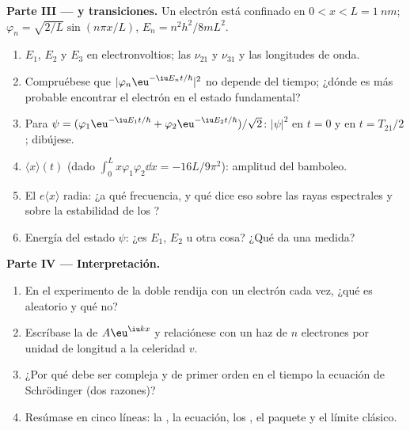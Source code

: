 \begin{problem}
\textbf{Parte III ---  y transiciones.}
Un electrón está confinado en $0 < x < L = \qty{1}{nm}$; $\varphi_n =
\sqrt{2/L}\sin(n\pi x/L)$, $E_n = n^2h^2/8mL^2$.
\begin{enumerate}[resume]
  \item $E_1$, $E_2$ y $E_3$ en electronvoltios; las 
        $\nu_{21}$ y $\nu_{31}$ y las longitudes de onda.
  \item Compruébese que $|\varphi_n\eu^{-\iu E_nt/\hbar}|^2$ no depende del tiempo;
        ¿dónde es más probable encontrar el electrón en el estado fundamental?
  \item Para $\psi = (\varphi_1\eu^{-\iu E_1t/\hbar} + \varphi_2\eu^{-\iu E_2t/\hbar})/
        \sqrt2$: $|\psi|^2$ en $t = 0$ y en $t = T_{21}/2$; dibújese.
  \item $\langle x\rangle(t)$ (dado $\int_0^Lx\varphi_1\varphi_2\dd x = -16L/9\pi^2$):
        amplitud del bamboleo.
  \item El  $e\langle x\rangle$ radia: ¿a qué
        frecuencia, y qué dice eso sobre las rayas espectrales y
        sobre la estabilidad de los ?
  \item Energía del estado $\psi$: ¿es $E_1$, $E_2$ u otra
        cosa? ¿Qué da una medida?
\end{enumerate}

\textbf{Parte IV --- Interpretación.}
\begin{enumerate}[resume]
  \item En el experimento de la doble rendija con un electrón cada vez, ¿qué es aleatorio
        y qué no?
  \item Escríbase la  de $A\eu^{\iu kx}$ y relaciónese con
        un haz de $n$ electrones por unidad de longitud a la celeridad $v$.
  \item ¿Por qué debe ser compleja y de primer orden en el tiempo la ecuación de
        Schrödinger (dos razones)?
  \item Resúmase en cinco líneas: la , la ecuación, los
        , el paquete y el límite clásico.
\end{enumerate}
\end{problem}

